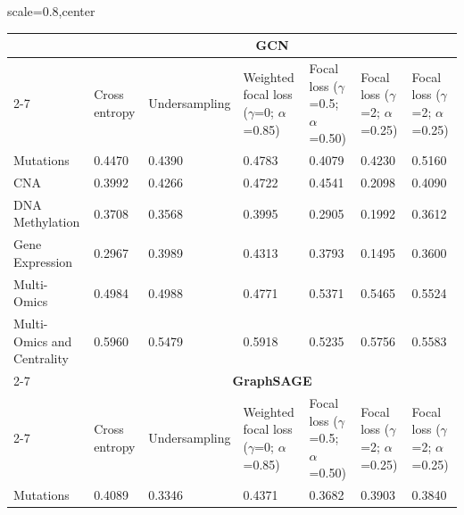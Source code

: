 \documentclass[ppgc, diss, english]{iiufrgs}
\begin{document}
\begin{landscape}
\begin{table}[!th]
\begin{adjustbox}{scale=0.8,center}
\begin{tabular}{lllllll}
                           & \multicolumn{6}{c}{\textbf{GCN}}                                                                                                                              \\ \cline{2-7} 
                           & Cross entropy & Undersampling & Weighted focal loss ($\gamma$=0; $\alpha$=0.85) & Focal loss ($\gamma$=0.5; $\alpha$=0.50) & Focal loss ($\gamma$=2; $\alpha$=0.25) & Focal loss ($\gamma$=2; $\alpha$=0.25) \\
Mutations                  & 0.4470        & 0.4390        & 0.4783                            & 0.4079                     & 0.4230                   & 0.5160                   \\
CNA                        & 0.3992        & 0.4266        & 0.4722                            & 0.4541                     & 0.2098                   & 0.4090                   \\
DNA Methylation            & 0.3708        & 0.3568        & 0.3995                            & 0.2905                     & 0.1992                   & 0.3612                   \\
Gene Expression            & 0.2967        & 0.3989        & 0.4313                            & 0.3793                     & 0.1495                   & 0.3600                   \\
Multi-Omics                & 0.4984        & 0.4988        & 0.4771                            & 0.5371                     & 0.5465                   & 0.5524                   \\
Multi-Omics and Centrality & 0.5960        & 0.5479        & 0.5918                            & 0.5235                     & 0.5756                   & 0.5583                   \\ \cline{2-7} 
                           & \multicolumn{6}{c}{\textbf{GraphSAGE}}                                                                                                                        \\ \cline{2-7} 
                           & Cross entropy & Undersampling & Weighted focal loss ($\gamma$=0; $\alpha$=0.85) & Focal loss ($\gamma$=0.5; $\alpha$=0.50) & Focal loss ($\gamma$=2; $\alpha$=0.25) & Focal loss ($\gamma$=2; $\alpha$=0.25) \\
Mutations                  & 0.4089        & 0.3346        & 0.4371                            & 0.3682                     & 0.3903                   & 0.3840                   \\

\end{tabular}
\end{adjustbox}
\end{table}
\end{landscape}
\end{document}
